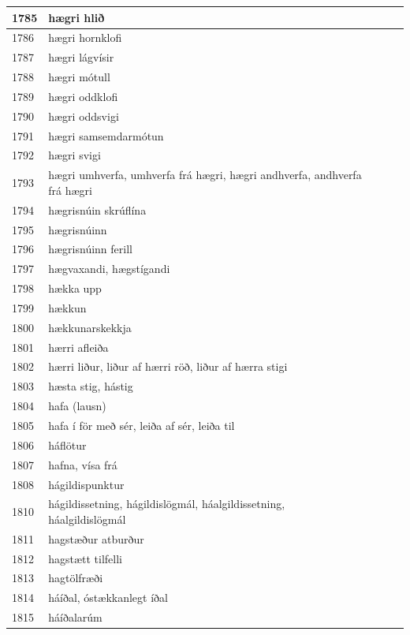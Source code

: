 \begin{longtable}{p{}|p{}|p{}|p{}|p{}}
1785 & hægri hlið &  &  &  \\
\hline
1786 & hægri hornklofi &  &  &  \\
\hline
1787 & hægri lágvísir &  &  &  \\
\hline
1788 & hægri mótull &  &  &  \\
\hline
1789 & hægri oddklofi &  &  &  \\
\hline
1790 & hægri oddsvigi &  &  &  \\
\hline
1791 & hægri samsemdarmótun &  &  &  \\
\hline
1792 & hægri svigi &  &  &  \\
\hline
1793 & hægri umhverfa, umhverfa frá hægri, hægri andhverfa, andhverfa frá hægri &  &  &  \\
\hline
1794 & hægrisnúin skrúflína &  &  &  \\
\hline
1795 & hægrisnúinn &  &  &  \\
\hline
1796 & hægrisnúinn ferill &  &  &  \\
\hline
1797 & hægvaxandi, hægstígandi &  &  &  \\
\hline
1798 & hækka upp &  &  &  \\
\hline
1799 & hækkun &  &  &  \\
\hline
1800 & hækkunarskekkja &  &  &  \\
\hline
1801 & hærri afleiða &  &  &  \\
\hline
1802 & hærri liður, liður af hærri röð, liður af hærra stigi &  &  &  \\
\hline
1803 & hæsta stig, hástig &  &  &  \\
\hline
1804 & hafa (lausn) &  &  &  \\
\hline
1805 & hafa í för með sér, leiða af sér, leiða til &  &  &  \\
\hline
1806 & háflötur &  &  &  \\
\hline
1807 & hafna, vísa frá &  &  &  \\
\hline
1808 & hágildispunktur &  &  &  \\
\hline
1810 & hágildissetning, hágildislögmál, háalgildissetning, háalgildislögmál &  &  &  \\
\hline
1811 & hagstæður atburður &  &  &  \\
\hline
1812 & hagstætt tilfelli &  &  &  \\
\hline
1813 & hagtölfræði &  &  &  \\
\hline
1814 & háíðal, óstækkanlegt íðal &  &  &  \\
\hline
1815 & háíðalarúm &  &  &  \\

\end{longtable}
